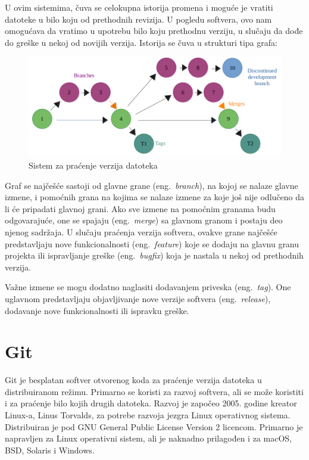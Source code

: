 \documentclass[12pt]{report}
\begin{document}
U ovim sistemima, čuva se celokupna istorija promena i moguće je vratiti datoteke u bilo koju od prethodnih revizija. U pogledu softvera, ovo nam omogućava da vratimo u upotrebu bilo koju prethodnu verziju, u slučaju da dođe do greške u nekoj od novijih verzija. Istorija se čuva u strukturi tipa grafa:

\begin{figure}[H]
    \includegraphics[width=\linewidth]{images/version_control.png}
    \caption{Sistem za praćenje verzija datoteka}
\end{figure}

Graf se najčešće sastoji od glavne grane (eng.\ \textit{branch}), na kojoj se nalaze glavne izmene, i pomoćnih grana na kojima se nalaze izmene za koje još nije odlučeno da li će pripadati glavnoj grani. Ako sve izmene na pomoćnim granama budu odgovarajuće, one se spajaju (eng.\ \textit{merge}) sa glavnom granom i postaju deo njenog sadržaja. U slučaju praćenja verzija softvera, ovakve grane najčešće predstavljaju nove funkcionalnosti (eng.\ \textit{feature}) koje se dodaju na glavnu granu projekta ili ispravljanje greške (eng.\ \textit{bugfix}) koja je nastala u nekoj od prethodnih verzija.

Važne izmene se mogu dodatno naglasiti dodavanjem priveska (eng.\ \textit{tag}). One uglavnom predstavljaju objavljivanje nove verzije softvera (eng.\ \textit{release}), dodavanje nove funkcionalnosti ili ispravku greške.

\section{Git}
Git \cite{git} je besplatan softver otvorenog koda za praćenje verzija datoteka u distribuiranom režimu. Primarno se koristi za razvoj softvera, ali se može koristiti i za praćenje bilo kojih drugih datoteka. Razvoj je započeo 2005. godine kreator Linux-a, Linus Torvalds, za potrebe razvoja jezgra Linux operativnog sistema. Distribuiran je pod GNU General Public License Version 2 licencom. Primarno je napravljen za Linux operativni sistem, ali je naknadno prilagođen i za macOS, BSD, Solaris i Windows.
\end{document}
